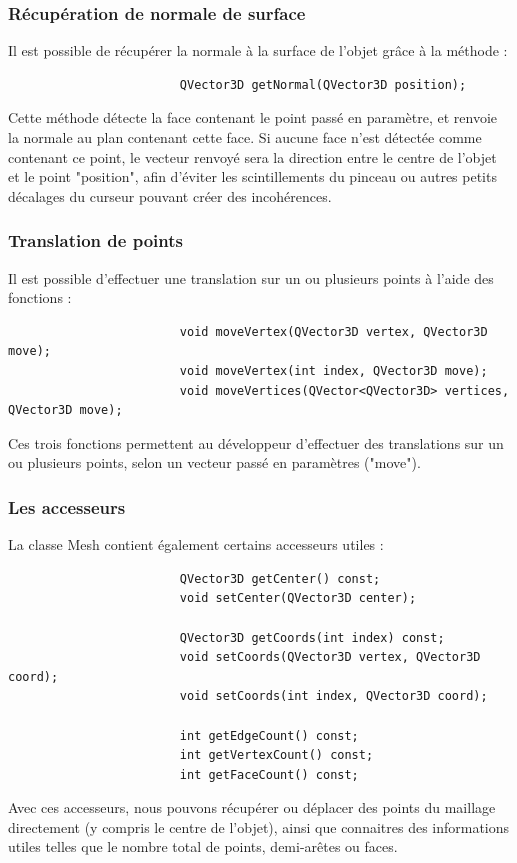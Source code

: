 \documentclass[a4paper]{memoir}
\begin{document}
				\subsubsection{Récupération de normale de surface}
					Il est possible de récupérer la normale à la surface de l'objet grâce à la méthode :
					\begin{verbatim}
						QVector3D getNormal(QVector3D position);
					\end{verbatim}
					Cette méthode détecte la face contenant le point passé en paramètre, et renvoie la normale au plan contenant cette face. Si aucune face 
					n'est détectée comme contenant ce point, le vecteur renvoyé sera la direction entre le centre de l'objet et le point "position", afin 
					d'éviter les scintillements du pinceau ou autres petits décalages du curseur pouvant créer des incohérences.
					
				\subsubsection{Translation de points}
					Il est possible d'effectuer une translation sur un ou plusieurs points à l'aide des fonctions :
					\begin{verbatim}
						void moveVertex(QVector3D vertex, QVector3D move);
						void moveVertex(int index, QVector3D move);
						void moveVertices(QVector<QVector3D> vertices, QVector3D move);
					\end{verbatim}
					Ces trois fonctions permettent au développeur d'effectuer des translations sur un ou plusieurs points, selon un vecteur passé en 
					paramètres ("move").
					
				\subsubsection{Les accesseurs}
					La classe Mesh contient également certains accesseurs utiles :
					\begin{verbatim}
						QVector3D getCenter() const;
						void setCenter(QVector3D center);

						QVector3D getCoords(int index) const;
						void setCoords(QVector3D vertex, QVector3D coord);
						void setCoords(int index, QVector3D coord);

						int getEdgeCount() const;
						int getVertexCount() const;
						int getFaceCount() const;
					\end{verbatim}
					Avec ces accesseurs, nous pouvons récupérer ou déplacer des points du maillage directement (y compris le centre de l'objet), ainsi que 
					connaitres des informations utiles telles que le nombre total de points, demi-arêtes ou faces.
				
\end{document}
